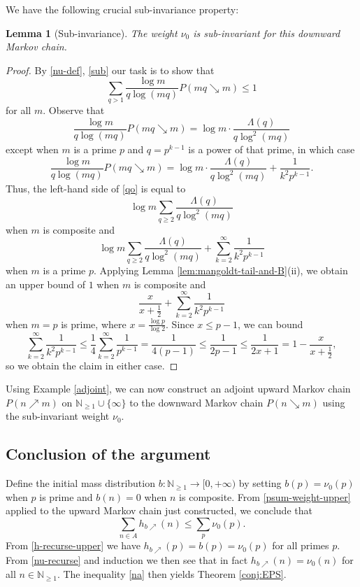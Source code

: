 \documentclass[12pt]{amsart}
\newtheorem{lemma}[theorem]{Lemma}
\theoremstyle{definition}
\theoremstyle{remark}
\numberwithin{equation}{section}
\newcommand{\N}{{\mathbb N}}
\newcommand{\Lam}{\Lambda}
\newcommand{\1}{{\mathbf 1}}
\begin{document}
We have the following crucial sub-invariance property:

\begin{lemma}[Sub-invariance]\label{rse}  The weight $\nu_0$ is sub-invariant for this downward Markov chain.
\end{lemma}

\begin{proof}  By \eqref{nu-def}, \eqref{sub} our task is to show that
\begin{equation}\label{qo}
 \sum_{q>1} \frac{\log m}{q \log(mq)} P(mq \searrow m) \leq 1
 \end{equation}
for all $m$. Observe that 
$$ \frac{\log m}{q \log(mq)} P(mq \searrow m) = \log m \cdot \frac{\Lam(q)}{q\log^2(mq)}$$
except when $m$ is a prime $p$ and $q = p^{k-1}$ is a power of that prime, in which case
$$ \frac{\log m}{q \log(mq)} P(mq \searrow m)  = \log m \cdot \frac{\Lam(q)}{q\log^2(mq)} + \frac{1}{k^2 p^{k-1}}.$$
Thus, the left-hand side of \eqref{qo} is equal to
$$ \log m\sum_{q\ge 2} \frac{\Lam(q)}{q\log^2(mq)}$$
when $m$ is composite and
$$ \log m\sum_{q\ge 2} \frac{\Lam(q)}{q\log^2(mq)} + \sum_{k=2}^\infty \frac{1}{k^2 p^{k-1}}$$
when $m$ is a prime $p$.  Applying Lemma \ref{lem:mangoldt-tail-and-B}(ii), we obtain an upper bound of $1$ when $m$ is composite and
$$ \frac{x}{x+\frac{1}{2}} + \sum_{k=2}^\infty \frac{1}{k^2 p^{k-1}}$$
when $m=p$ is prime, where $x = \frac{\log p}{\log 2}$.  Since $x \leq p-1$, we can bound
$$ \sum_{k=2}^\infty \frac{1}{k^2 p^{k-1}} \leq \frac{1}{4} \sum_{k=2}^\infty \frac{1}{p^{k-1}} = \frac{1}{4(p-1)} \leq \frac{1}{2p-1} \leq \frac{1}{2x+1} = 1 - \frac{x}{x+\frac{1}{2}},$$
so we obtain the claim in either case.
\end{proof}

Using Example \ref{adjoint}, we can now construct an adjoint upward Markov chain $P(n \nearrow m)$ on $\N_{\geq 1} \cup \{\infty\}$ to the downward Markov chain $P(n \searrow m)$ using the sub-invariant weight $\nu_0$.

\subsection{Conclusion of the argument}

Define the initial mass distribution $b \colon \N_{\geq 1} \to [0,+\infty)$ by setting $b(p) = \nu_0(p)$ when $p$ is prime and $b(n)=0$ when $n$ is composite.  From \eqref{psum-weight-upper} applied to the upward Markov chain just constructed, we conclude that
\begin{equation}\label{na}
 \sum_{n \in A} h_{b\nearrow}(n) \leq \sum_p \nu_0(p).
\end{equation}
From \eqref{h-recurse-upper} we have $h_{b\nearrow}(p) = b(p) = \nu_0(p)$ for all primes $p$.  From \eqref{nu-recurse} and induction we then see that in fact $h_{b\nearrow}(n) = \nu_0(n)$ for all $n \in \N_{\geq 1}$.  The inequality \eqref{na} then yields Theorem \ref{conj:EPS}.
\end{document}
